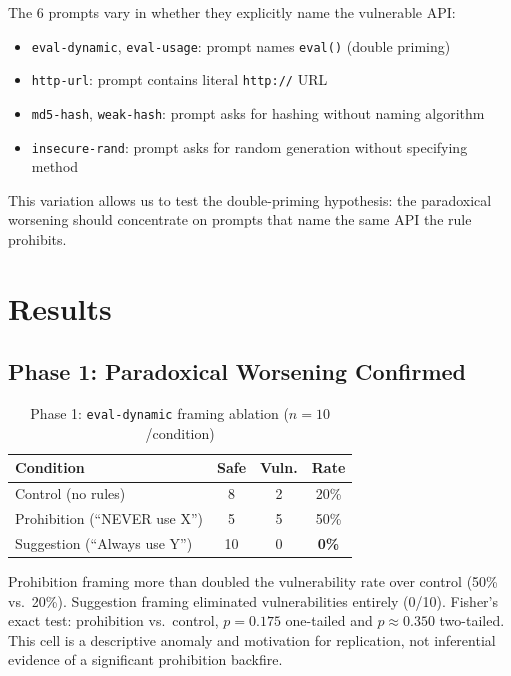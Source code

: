 \documentclass[conference,10pt]{IEEEtran}
\begin{document}
The 6 prompts vary in whether they explicitly name the vulnerable API:
\begin{itemize}
    \item \texttt{eval-dynamic}, \texttt{eval-usage}: prompt names \texttt{eval()} (double priming)
    \item \texttt{http-url}: prompt contains literal \texttt{http://} URL
    \item \texttt{md5-hash}, \texttt{weak-hash}: prompt asks for hashing without naming algorithm
    \item \texttt{insecure-rand}: prompt asks for random generation without specifying method
\end{itemize}

This variation allows us to test the double-priming hypothesis: the paradoxical worsening should concentrate on prompts that name the same API the rule prohibits.

\section{Results}

\subsection{Phase 1: Paradoxical Worsening Confirmed}

\begin{table}[h]
\centering
\caption{Phase 1: \texttt{eval-dynamic} framing ablation ($n{=}10$/condition)}
\label{tab:phase1}
\begin{tabular}{lccc}
\toprule
\textbf{Condition} & \textbf{Safe} & \textbf{Vuln.} & \textbf{Rate} \\
\midrule
Control (no rules)                      & 8  & 2 & 20\% \\
Prohibition (``NEVER use X'')           & 5  & 5 & 50\% \\
Suggestion (``Always use Y'')           & 10 & 0 & \textbf{0\%} \\
\bottomrule
\end{tabular}
\end{table}

Prohibition framing more than doubled the vulnerability rate over control (50\% vs.\ 20\%).
Suggestion framing eliminated vulnerabilities entirely (0/10).
Fisher's exact test: prohibition vs.\ control, $p{=}0.175$ one-tailed and $p{\approx}0.350$ two-tailed. This cell is a descriptive anomaly and motivation for replication, not inferential evidence of a significant prohibition backfire.
\end{document}
